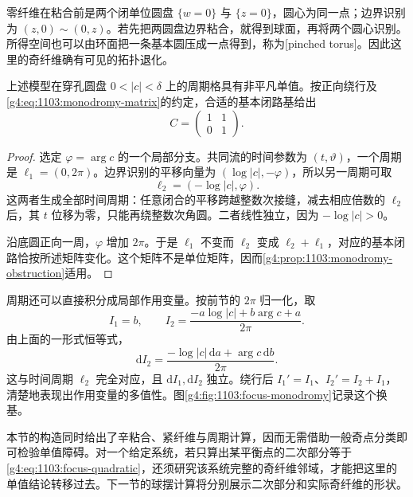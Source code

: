 零纤维在粘合前是两个闭单位圆盘 \(\{w=0\}\) 与 \(\{z=0\}\)，圆心为同一点；边界识别为 \((z,0)\sim(0,z)\)。若先把两圆盘边界粘合，就得到球面，再将两个圆心识别。所得空间也可以由环面把一条基本圆压成一点得到，称为[pinched torus]。因此这里的奇纤维确有可见的拓扑退化。

\begin{proposition}\label{g4:prop:1103:focus-monodromy}
	上述模型在穿孔圆盘 \(0<|c|<\delta\) 上的周期格具有非平凡单值。按正向绕行及\eqref{g4:eq:1103:monodromy-matrix}的约定，合适的基本闭路基给出
	\[
		C=\begin{pmatrix}1&1\\0&1\end{pmatrix}.
	\]
\end{proposition}
\begin{proof}
	选定 \(\varphi=\arg c\) 的一个局部分支。共同流的时间参数为 \((t,\vartheta)\)，一个周期是 \(\ell_1=(0,2\pi)\)。边界识别的平移向量为 \((\log|c|,-\varphi)\)，所以另一周期可取
	\begin{equation}\label{g4:eq:1103:focus-periods}
		\ell_2=(-\log|c|,\varphi).
	\end{equation}
	这两者生成全部时间周期：任意闭合的平移跨越整数次接缝，减去相应倍数的 \(\ell_2\) 后，其 \(t\) 位移为零，只能再绕整数次角圆。二者线性独立，因为 \(-\log|c|>0\)。

	沿底圆正向一周，\(\varphi\) 增加 \(2\pi\)。于是 \(\ell_1\) 不变而 \(\ell_2\) 变成 \(\ell_2+\ell_1\)，对应的基本闭路恰按所述矩阵变化。这个矩阵不是单位矩阵，因而\cref{g4:prop:1103:monodromy-obstruction}适用。
\end{proof}

周期还可以直接积分成局部作用变量。按前节的 \(2\pi\) 归一化，取
\begin{equation}\label{g4:eq:1103:focus-actions}
	I_1=b,\qquad
	I_2=\frac{-a\log|c|+b\arg c+a}{2\pi}.
\end{equation}
由上面的一形式恒等式，
\[
	\mathrm{d}I_2=\frac{-\log|c|\,\mathrm{d}a+\arg c\,\mathrm{d}b}{2\pi}.
\]
这与时间周期 \(\ell_2\) 完全对应，且 \(\mathrm{d}I_1,\mathrm{d}I_2\) 独立。绕行后 \(I_1'=I_1\)、\(I_2'=I_2+I_1\)，清楚地表现出作用变量的多值性。图\ref{g4:fig:1103:focus-monodromy}记录这个换基。



本节的构造同时给出了辛粘合、紧纤维与周期计算，因而无需借助一般奇点分类即可检验单值障碍。对一个给定系统，若只算出某平衡点的二次部分等于\eqref{g4:eq:1103:focus-quadratic}，还须研究该系统完整的奇纤维邻域，才能把这里的单值结论转移过去。下一节的球摆计算将分别展示二次部分和实际奇纤维的形状。
